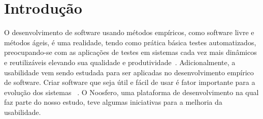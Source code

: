 \section{Introdução}
\label{introducao}

O desenvolvimento de software usando métodos empíricos, como software livre e métodos ágeis, é uma realidade, tendo como prática básica testes automatizados, preocupando-se com as aplicações de testes em sistemas cada vez mais dinâmicos e reutilizáveis elevando sua qualidade e produtividade~\cite{vicente2010}.
%
Adicionalmente, a usabilidade vem sendo estudada para ser aplicadas no desenvolvimento empírico de software. Criar software que seja útil e fácil de usar é fator importante para a evolução dos sistemas ~\cite{santos2012}.
%
O Noosfero, uma plataforma de desenvolvimento na qual faz parte do nosso estudo, teve algumas iniciativas para a melhoria da usabilidade.
